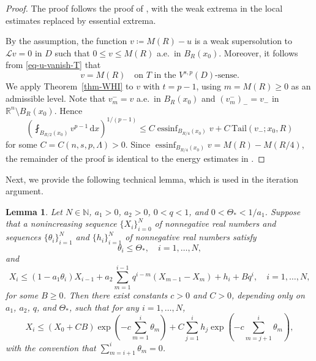 \documentclass[11pt]{amsart}
\theoremstyle{plain}
\newtheorem{lemma}[theorem]{Lemma}
\theoremstyle{definition}
\numberwithin{equation}{section}
\DeclareMathOperator*{\essinf}{essinf}
\begin{document}
\begin{proof}
The proof follows the proof of \cite[Lemma~4.1]{KLL23}, with the weak extrema in the local estimates replaced by essential extrema.

By the assumption, the function $v\coloneqq M(R)-u$ is a weak supersolution to $\mathcal{L}v=0$ in $D$ such that $0\leq v \leq M(R)$ a.e.\ in $B_{R}(x_0)$. Moreover, it follows from \eqref{eq-u-vanish-T} that
\begin{equation*}
v=M(R) \quad\text{on }T \text{ in the $V^{s,p}(D)$-sense}.
\end{equation*}
We apply Theorem~\ref{thm-WHI} to $v$ with $t=p-1$, using $m=M(R) \geq 0$ as an admissible level. Note that $v_m^-=v$ a.e.\ in $B_R(x_0)$ and $(v_m^-)_-=v_-$ in $\mathbb{R}^n \setminus B_R(x_0)$. Hence
\begin{equation*}
\left( \fint_{B_{R/2}(x_0)} v^{p-1} \,\mathrm{d}x \right)^{1/(p-1)} \leq C \essinf_{B_{R/4}(x_0)} v + C\,\mathrm{Tail}(v_-; x_0, R)
\end{equation*}
for some $C=C(n, s, p, \Lambda)>0$. Since $\essinf_{B_{R/4}(x_0)}v=M(R) - M(R/4)$, the remainder of the proof is identical to the energy estimates in \cite[Lemmas~4.1 and 4.2]{KLL23}.
\end{proof}

Next, we provide the following technical lemma, which is used in the iteration argument.

\begin{lemma}\label{lem-iteration}
Let $N \in \mathbb{N}$, $a_1>0$, $a_2>0$, $0<q<1$, and $0<\Theta_{\ast} < 1/a_1$. Suppose that a nonincreasing sequence $\{X_i\}_{i=0}^{N}$ of nonnegative real numbers and sequences $\{\theta_i\}_{i=1}^N$ and $\{h_i\}_{i=1}^N$ of nonnegative real numbers satisfy
\begin{equation*}
\theta_i\leq\Theta_\ast, \quad i=1,\dots,N,
\end{equation*}
and
\begin{equation}\label{eq-technical}
X_i \leq (1-a_1\theta_i)X_{i-1}+a_2\sum_{m=1}^{i-1}q^{i-m}(X_{m-1}-X_m) +h_i+Bq^i, \quad i=1, \dots, N,
\end{equation}
for some $B \geq 0$. Then there exist constants $c>0$ and $C>0$, depending only on $a_1$, $a_2$, $q$, and $\Theta_{\ast}$, such that for any $i=1, \dots, N$,
\begin{equation*}
X_i \leq (X_0+CB)\exp\left(-c\sum_{m=1}^{i}\theta_m\right)+C\sum_{j=1}^ih_j\exp\left(-c\sum_{m=j+1}^{i}\theta_m\right),
\end{equation*}
with the convention that $\sum_{m=i+1}^i \theta_m=0$.
\end{lemma}
\end{document}
